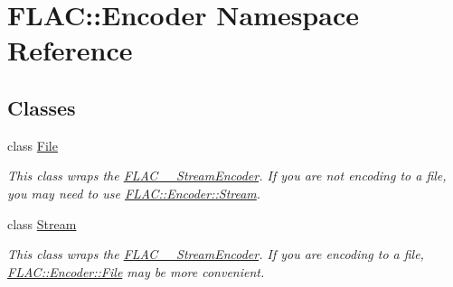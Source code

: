 \hypertarget{namespace_f_l_a_c_1_1_encoder}{}\section{F\+L\+AC\+:\+:Encoder Namespace Reference}
\label{namespace_f_l_a_c_1_1_encoder}
\subsection*{Classes}
\begin{DoxyCompactItemize}
\item 
class \hyperlink{class_f_l_a_c_1_1_encoder_1_1_file}{File}
\begin{DoxyCompactList}\small\item\em This class wraps the \hyperlink{struct_f_l_a_c_____stream_encoder}{F\+L\+A\+C\+\_\+\+\_\+\+Stream\+Encoder}. If you are not encoding to a file, you may need to use \hyperlink{class_f_l_a_c_1_1_encoder_1_1_stream}{F\+L\+A\+C\+::\+Encoder\+::\+Stream}. \end{DoxyCompactList}\item 
class \hyperlink{class_f_l_a_c_1_1_encoder_1_1_stream}{Stream}
\begin{DoxyCompactList}\small\item\em This class wraps the \hyperlink{struct_f_l_a_c_____stream_encoder}{F\+L\+A\+C\+\_\+\+\_\+\+Stream\+Encoder}. If you are encoding to a file, \hyperlink{class_f_l_a_c_1_1_encoder_1_1_file}{F\+L\+A\+C\+::\+Encoder\+::\+File} may be more convenient. \end{DoxyCompactList}\end{DoxyCompactItemize}
